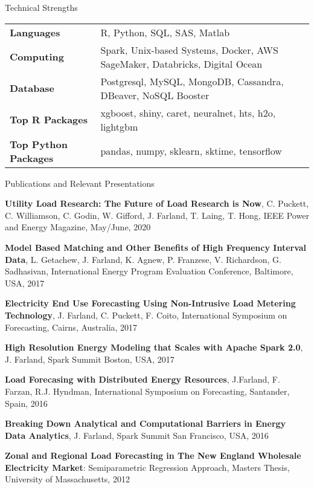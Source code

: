 \documentclass{resume} %
\begin{document}
\begin{rSection}{Technical Strengths}

\begin{tabular}{ @{} >{\bfseries}l @{\hspace{6ex}} l }
Languages & R, Python, SQL, SAS, Matlab \\
Computing & Spark, Unix-based Systems, Docker, AWS SageMaker, Databricks, Digital Ocean\\
Database & Postgresql, MySQL, MongoDB, Cassandra, DBeaver, NoSQL Booster \\
Top R Packages &  xgboost, shiny, caret, neuralnet, hts, h2o, lightgbm  \\
Top Python Packages & pandas, numpy, sklearn, sktime, tensorflow   \\
\end{tabular}

\end{rSection}



\begin{rSection}{Publications and Relevant Presentations}

\item {\bf Utility Load Research: The Future of Load Research is Now}, C. Puckett, C. Williamson, C. Godin, W. Gifford, J. Farland, T. Laing, T. Hong, IEEE Power and Energy Magazine, May/June, 2020

\item {\bf Model Based Matching and Other Benefits of High Frequency Interval Data}, L. Getachew, J. Farland, K. Agnew, P. Franzese, V. Richardson, G. Sadhasivan, International Energy Program Evaluation Conference, Baltimore, USA, 2017

\item {\bf Electricity End Use Forecasting Using Non-Intrusive Load Metering Technology}, J. Farland, C. Puckett, F. Coito, International Symposium on Forecasting, Cairns, Australia, 2017

\item {\bf High Resolution Energy Modeling that Scales with Apache Spark 2.0}, J. Farland, Spark Summit Boston, USA, 2017

\item {\bf Load Forecasing with Distributed Energy Resources}, J.Farland, F. Farzan, R.J. Hyndman, International Symposium on Forecasting, Santander, Spain, 2016

\item {\bf Breaking Down Analytical and Computational Barriers in Energy Data Analytics}, J. Farland, Spark Summit San Francisco, USA, 2016

\item {\bf  Zonal and Regional Load Forecasting in The New England Wholesale Electricity Market}: Semiparametric Regression Approach, Masters Thesis, University of Massachusetts, 2012

\end{rSection}
\end{document}
